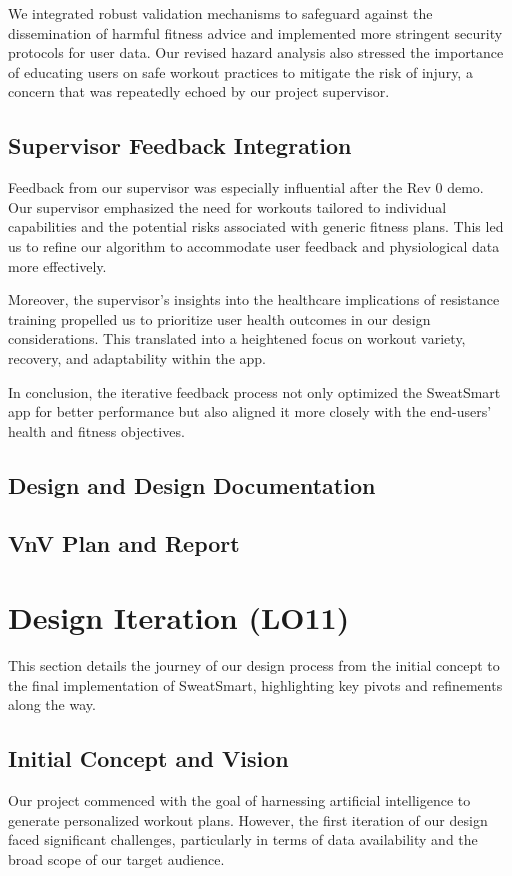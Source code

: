 \documentclass{article}
\begin{document}
We integrated robust validation mechanisms to safeguard against the dissemination of harmful fitness advice and implemented more stringent security protocols for user data. Our revised hazard analysis also stressed the importance of educating users on safe workout practices to mitigate the risk of injury, a concern that was repeatedly echoed by our project supervisor.

\subsection{Supervisor Feedback Integration}
Feedback from our supervisor was especially influential after the Rev 0 demo. Our supervisor emphasized the need for workouts tailored to individual capabilities and the potential risks associated with generic fitness plans. This led us to refine our algorithm to accommodate user feedback and physiological data more effectively.

Moreover, the supervisor's insights into the healthcare implications of resistance training propelled us to prioritize user health outcomes in our design considerations. This translated into a heightened focus on workout variety, recovery, and adaptability within the app.

In conclusion, the iterative feedback process not only optimized the SweatSmart app for better performance but also aligned it more closely with the end-users' health and fitness objectives.

\subsection{Design and Design Documentation}

\subsection{VnV Plan and Report}

\section{Design Iteration (LO11)}

This section details the journey of our design process from the initial concept to the final implementation of SweatSmart, highlighting key pivots and refinements along the way.

\subsection{Initial Concept and Vision}
Our project commenced with the goal of harnessing artificial intelligence to generate personalized workout plans. However, the first iteration of our design faced significant challenges, particularly in terms of data availability and the broad scope of our target audience.
\end{document}

